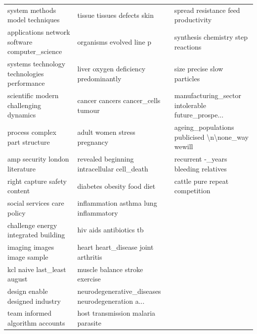\documentclass[11pt]{article}
\begin{document}
\begin{landscape}
\begin{table}
\begin{tabular}{lll}
                   system methods model techniques &                        tissue tissues defects skin &                spread resistance feed productivity \\
    applications network software computer\_science &                           organisms evolved line p &                 synthesis chemistry step reactions \\
       systems technology technologies performance &              liver oxygen deficiency predominantly &                        size precise slow particles \\
            scientific modern challenging dynamics &                 cancer cancers cancer\_cells tumour &  manufacturing\_sector intolerable future\_prospe... \\
                    process complex part structure &                       adult women stress pregnancy &   ageing\_populations publicised \textbackslash n\textbackslash none\_way wewill \\
                    amp security london literature &        revealed beginning intracellular cell\_death &               recurrent -\_years bleeding relatives \\
                      right capture safety content &                         diabetes obesity food diet &                     cattle pure repeat competition \\
                       social services care policy &              inflammation asthma lung inflammatory &                                                    \\
              challenge energy integrated building &                            hiv aids antibiotics tb &                                                    \\
                       imaging images image sample &                heart heart\_disease joint arthritis &                                                    \\
                       kcl naive last\_least august &                     muscle balance stroke exercise &                                                    \\
                   design enable designed industry &  neurodegenerative\_diseases neurodegeneration a... &                                                    \\
                  team informed algorithm accounts &                 host transmission malaria parasite &                                                    \\

\end{tabular}
\end{table}
\end{landscape}
\end{document}
